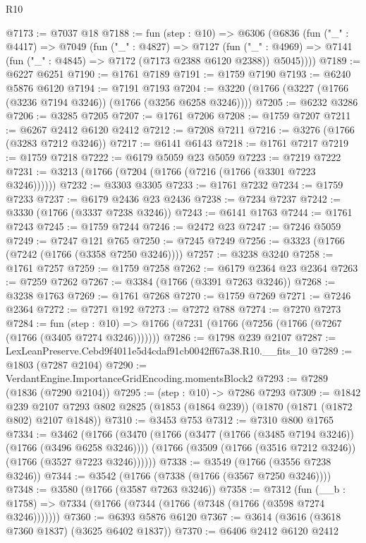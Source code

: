 \begin{lexlean}{R10}
\begin{coremodule}
@7173 := @7037 @18
@7188 := fun (step : @10) =>
  @6306
    (@6836
      (fun ("_" : @4417) =>
      @7049
        (fun ("_" : @4827) =>
        @7127
          (fun ("_" : @4969) =>
          @7141 (fun ("_" : @4845) => @7172 (@7173 @2388 @6120 @2388)) @5045))))
@7189 := @6227 @6251
@7190 := @1761 @7189
@7191 := @1759 @7190
@7193 := @6240 @5876 @6120
@7194 := @7191 @7193
@7204 := @3220 (@1766 (@3227 (@1766 (@3236 @7194 @3246)) (@1766 (@3256 @6258 @3246))))
@7205 := @6232 @3286
@7206 := @3285 @7205
@7207 := @1761 @7206
@7208 := @1759 @7207
@7211 := @6267 @2412 @6120 @2412
@7212 := @7208 @7211
@7216 := @3276 (@1766 (@3283 @7212 @3246))
@7217 := @6141 @6143
@7218 := @1761 @7217
@7219 := @1759 @7218
@7222 := @6179 @5059 @23 @5059
@7223 := @7219 @7222
@7231 := @3213 (@1766 (@7204 (@1766 (@7216 (@1766 (@3301 @7223 @3246))))))
@7232 := @3303 @3305
@7233 := @1761 @7232
@7234 := @1759 @7233
@7237 := @6179 @2436 @23 @2436
@7238 := @7234 @7237
@7242 := @3330 (@1766 (@3337 @7238 @3246))
@7243 := @6141 @1763
@7244 := @1761 @7243
@7245 := @1759 @7244
@7246 := @2472 @23
@7247 := @7246 @5059
@7249 := @7247 @121 @765
@7250 := @7245 @7249
@7256 := @3323 (@1766 (@7242 (@1766 (@3358 @7250 @3246))))
@7257 := @3238 @3240
@7258 := @1761 @7257
@7259 := @1759 @7258
@7262 := @6179 @2364 @23 @2364
@7263 := @7259 @7262
@7267 := @3384 (@1766 (@3391 @7263 @3246))
@7268 := @3238 @1763
@7269 := @1761 @7268
@7270 := @1759 @7269
@7271 := @7246 @2364
@7272 := @7271 @192
@7273 := @7272 @788
@7274 := @7270 @7273
@7284 := fun (step : @10) =>
  @1766 (@7231 (@1766 (@7256 (@1766 (@7267 (@1766 (@3405 @7274 @3246)))))))
@7286 := @1798 @239 @2107
@7287 := LexLeanPreserve.Cebd9f4011e5d4cdaf91cb0042ff67a38.R10.__fits_10
@7289 := @1803 (@7287 @2104)
@7290 := VerdantEngine.ImportanceGridEncoding.momentsBlock2
@7293 := @7289 (@1836 (@7290 @2104))
@7295 := (step : @10) -> @7286 @7293
@7309 := @1842
    @239
    @2107
    @7293
    @802
    @2825
    (@1853 (@1864 @239))
    (@1870 (@1871 (@1872 @802) @2107 @1848))
@7310 := @3453 @753
@7312 := @7310 @800 @1765
@7334 := @3462
    (@1766
      (@3470
        (@1766 (@3477 (@1766 (@3485 @7194 @3246)) (@1766 (@3496 @6258 @3246))))
        (@1766 (@3509 (@1766 (@3516 @7212 @3246)) (@1766 (@3527 @7223 @3246))))))
@7338 := @3549 (@1766 (@3556 @7238 @3246))
@7344 := @3542 (@1766 (@7338 (@1766 (@3567 @7250 @3246))))
@7348 := @3580 (@1766 (@3587 @7263 @3246))
@7358 := @7312
    (fun (__b : @1758) => @7334 (@1766 (@7344 (@1766 (@7348 (@1766 (@3598 @7274 @3246)))))))
@7360 := @6393 @5876 @6120
@7367 := @3614 (@3616 (@3618 @7360 @1837) (@3625 @6402 @1837))
@7370 := @6406 @2412 @6120 @2412

\end{coremodule}
\end{lexlean}
